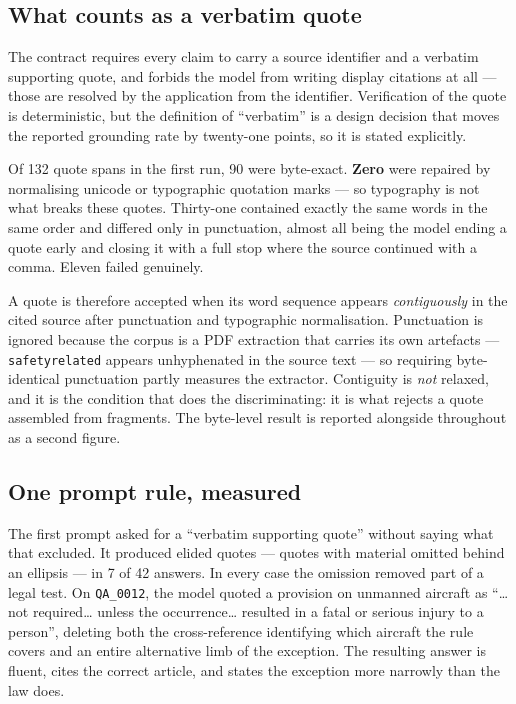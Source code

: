 \subsection{What counts as a verbatim quote}

The contract requires every claim to carry a source identifier and a verbatim
supporting quote, and forbids the model from writing display citations at all ---
those are resolved by the application from the identifier. Verification of the
quote is deterministic, but the definition of \enquote{verbatim} is a design
decision that moves the reported grounding rate by twenty-one points, so it is
stated explicitly.

Of 132 quote spans in the first run, 90 were byte-exact. \textbf{Zero} were
repaired by normalising unicode or typographic quotation marks --- so typography
is not what breaks these quotes. Thirty-one contained exactly the same words in
the same order and differed only in punctuation, almost all being the model ending
a quote early and closing it with a full stop where the source continued with a
comma. Eleven failed genuinely.

A quote is therefore accepted when its word sequence appears \emph{contiguously}
in the cited source after punctuation and typographic normalisation. Punctuation
is ignored because the corpus is a PDF extraction that carries its own artefacts
--- \texttt{safetyrelated} appears unhyphenated in the source text --- so requiring
byte-identical punctuation partly measures the extractor. Contiguity is \emph{not} relaxed, and it is the condition that does the
discriminating: it is what rejects a quote assembled from fragments. The byte-level result is reported alongside
throughout as a second figure.

\subsection{One prompt rule, measured}

The first prompt asked for a \enquote{verbatim supporting quote} without saying
what that excluded. It produced elided quotes --- quotes with material omitted
behind an ellipsis --- in 7 of 42 answers. In every case the omission removed
part of a legal test. On \texttt{QA\_0012}, the model quoted a provision on
unmanned aircraft as
\enquote{\ldots not required\ldots{} unless the occurrence\ldots{} resulted in a
fatal or serious injury to a person}, deleting both the cross-reference
identifying which aircraft the rule covers and an entire alternative limb of the
exception. The resulting answer is fluent, cites the correct article, and states
the exception more narrowly than the law does.

